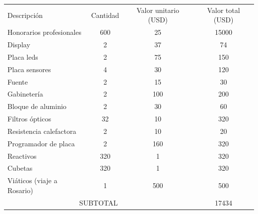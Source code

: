 \documentclass[
11pt, %
]{charter}
\begin{document}
\begin{table}[htpb]
\centering
\begin{tabularx}{\linewidth}{@{}|X|c|r|r|@{}}
\hline
\rowcolor[HTML]{C0C0C0} 
\multicolumn{4}{|c|}{\cellcolor[HTML]{C0C0C0}COSTOS DIRECTOS} \\ \hline
\rowcolor[HTML]{C0C0C0} 
Descripción &
  \multicolumn{1}{c|}{\cellcolor[HTML]{C0C0C0}Cantidad} &
  \multicolumn{1}{c|}{\cellcolor[HTML]{C0C0C0}Valor unitario (USD)} &
  \multicolumn{1}{c|}{\cellcolor[HTML]{C0C0C0}Valor total (USD)} \\ \hline
 Honorarios profesionales &
  \multicolumn{1}{c|}{600} &
  \multicolumn{1}{c|}{25} &
  \multicolumn{1}{c|}{15000} \\ \hline
 Display &
  \multicolumn{1}{c|}{2} &
  \multicolumn{1}{c|}{37} &
  \multicolumn{1}{c|}{74} \\ \hline
Placa leds &
  \multicolumn{1}{c|}{2} &
  \multicolumn{1}{c|}{75} &
  \multicolumn{1}{c|}{150} \\ \hline
Placa sensores &
  \multicolumn{1}{c|}{4} &
  \multicolumn{1}{c|}{30} &
  \multicolumn{1}{c|}{120} \\ \hline
Fuente &
  \multicolumn{1}{c|}{2} &
  \multicolumn{1}{c|}{15} &
  \multicolumn{1}{c|}{30} \\ \hline
Gabinetería &
  \multicolumn{1}{c|}{2} &
  \multicolumn{1}{c|}{100} &
  \multicolumn{1}{c|}{200} \\ \hline
Bloque de aluminio &
  \multicolumn{1}{c|}{2} &
  \multicolumn{1}{c|}{30} &
  \multicolumn{1}{c|}{60} \\ \hline
Filtros ópticos &
  \multicolumn{1}{c|}{32} &
  \multicolumn{1}{c|}{10} &
  \multicolumn{1}{c|}{320} \\ \hline
Resistencia calefactora &
  \multicolumn{1}{c|}{2} &
  \multicolumn{1}{c|}{10} &
  \multicolumn{1}{c|}{20} \\ \hline
Programador de placa &
  \multicolumn{1}{c|}{2} &
  \multicolumn{1}{c|}{160} &
  \multicolumn{1}{c|}{320} \\ \hline
Reactivos &
  \multicolumn{1}{c|}{320} &
  \multicolumn{1}{c|}{1} &
  \multicolumn{1}{c|}{320} \\ \hline
Cubetas &
  \multicolumn{1}{c|}{320} &
  \multicolumn{1}{c|}{1} &
  \multicolumn{1}{c|}{320} \\ \hline
Viáticos (viaje a Rosario) &
  \multicolumn{1}{c|}{1} &
  \multicolumn{1}{c|}{500} &
  \multicolumn{1}{c|}{500} \\ \hline
\multicolumn{3}{|c|}{SUBTOTAL} &
  \multicolumn{1}{c|}{17434} \\ \hline

\end{tabularx}
\end{table}
\end{document}

